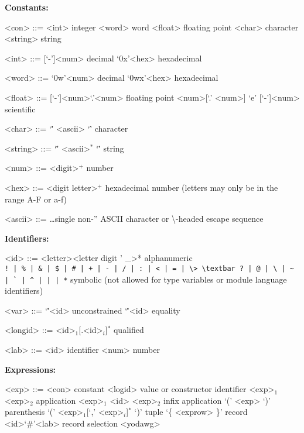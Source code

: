 \documentclass[11pt]{article}
\begin{document}
\textbf{Constants:}
\begin{grammar}
<con>	::= <int>	 integer
  \alt <word>	   word
  \alt <float>	   floating point
  \alt <char>	   character
  \alt <string>   string

<int>	::=	 [`-']<num>   decimal
  \alt [`-']`0x'<hex> hexadecimal

<word>	::=	`0w'<num>	 decimal
  \alt `0wx'<hex>	 hexadecimal

<float>	::=	 [`-']<num>`.'<num> floating point
  \alt <num>[`.' <num>] `e' [`-']<num>   	 scientific

<char>	::=	`\'' <ascii> `\''	character

<string>  	::=	`\"' <ascii>$^*$ `\"'	 string

<num>	::=	 <digit>$^+$	 number

<hex>	::=	 <digit \textbar letter>$^+$	 hexadecimal number (letters may only be in the range A-F or a-f)

<ascii>	::=	\dots single non-'' ASCII character or \textbackslash-headed escape sequence
\end{grammar}

\textbf{Identifiers:}
\begin{grammar}
<id>	::=  	<letter><letter \textbar digit \textbar ' \textbar \_>*	 alphanumeric \\
 \verb[! | % | & | $ | # | + | - | / | : | < | = | \> \textbar ? | @ | \ | ~ | ` | ^ | | | *[   	 symbolic (not allowed for type variables or module language identifiers)

<var>	::=	`\''<id>	 unconstrained
\alt `\'\''<id>	 equality

<longid>   	::=	<id>$_1$[.<id>$_i$]$^*$	 qualified

<lab>	::=	<id>	 identifier
  \alt <num>	 number
\end{grammar}

\textbf{Expressions:}
\begin{grammar}
  <exp> ::= <con> constant
    \alt [op]<logid> value or constructor identifier
    \alt <exp>$_1$<exp>$_2$ application
    \alt <exp>$_1$ <id> <exp>$_2$ infix application
    \alt `(' <exp> `)' parenthesis
    \alt `(' <exp>$_1$[`,' <exp>$_i$]$^*$ `)' tuple
    \alt `\{ <exprow> \}' record
    \alt <id>`#'<lab> record selection
    \alt <yodawg>
\end{grammar}
\end{document}
